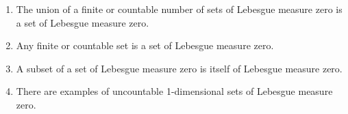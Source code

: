 \begin{claim}\label{claim:9.1}
\begin{enumerate}
    \item\label{item:claim:9.1:1} The union of a finite or countable number of sets of Lebesgue measure zero is a set of Lebesgue measure zero.
    \item\label{item:claim:9.1:2} Any finite or countable set is a set of Lebesgue measure zero.
    \item\label{item:claim:9.1:3} A subset of a set of Lebesgue measure zero is itself of Lebesgue measure zero.
    \item\label{item:claim:9.1:4} There are examples of uncountable 1-dimensional sets of Lebesgue measure zero.
\end{enumerate}
\end{claim}

